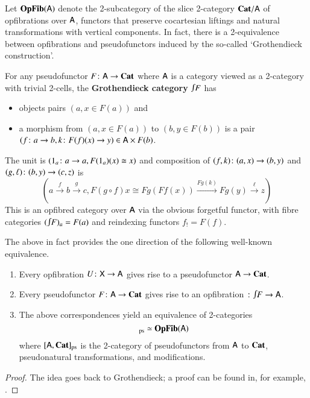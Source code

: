\documentclass[reqno]{amsart}
\begin{document}
Let $\mathbf{OpFib}(\mathsf{A})$ denote the 2-subcategory of the slice 2-category $\mathbf{Cat}/ \mathsf{A}$ of opfibrations over $\mathsf{A}$, functors that preserve cocartesian liftings and natural transformations with vertical components. In fact, there is a 2-equivalence between opfibrations and pseudofunctors induced by the so-called `Grothendieck construction'. 
\begin{defn}\label{def:GrothCat}
For any pseudofunctor $F\colon\mathsf{A}\to\mathbf{Cat}$ where $\mathsf{A}$ is a category viewed as a 2-category with trivial 2-cells, the \textbf{Grothendieck category}
$\inta F$ has
\begin{itemize}
\item objects pairs $(a, x \in F(a))$ and
\item a morphism from $(a, x \in F(a))$ to $(b, y\in F(b))$ is a pair $(f \colon a \to b,k \colon F(f)(x) \to y)\in\mathsf{A}\times F(b)$.
\end{itemize}
The unit is $(1_a\colon a\to a,F(1_a)(x)\cong x)$ and composition of $(f,k)\colon(a,x)\to(b,y)$ and $(g,\ell)\colon(b,y)\to(c,z)$ is
\begin{equation}\label{eq:compGrothcat}
\left(a\xrightarrow{f}b\xrightarrow{g}c, F(g\circ f)x\cong Fg(Ff(x))\xrightarrow{Fg(k)}Fg(y)\xrightarrow{\ell}z\right) 
\end{equation}
This is an opfibred category over $\mathsf{A}$ via the obvious forgetful functor, with fibre categories $(\inta F)_a=F(a)$ and reindexing functors $f_!=F(f)$.
\end{defn}
The above in fact provides the one direction of the following well-known equivalence.

\begin{thm}\label{thm:Grothendieck}\hfill
\begin{enumerate}
\item Every opfibration $U \colon \mathsf{X} \to \mathsf{A}$ gives rise to a pseudofunctor $\mathsf{A} \to \mathbf{Cat}$.
\item Every pseudofunctor $F \colon \mathsf{A} \to \mathbf{Cat}$ gives rise to  an opfibration $\maps \inta F\to\A$.
\item The above correspondences yield an equivalence of 2-categories 
\begin{displaymath}
[\A,\Cat]_\pse \simeq \OpFib(\A)
\end{displaymath}
where $[\mathsf{A},\mathbf{Cat}]_{\mathrm{ps}}$ is the 2-category of pseudofunctors from $\mathsf{A}$ to $\mathbf{Cat}$, pseudonatural transformations, and modifications.
\end{enumerate}
\end{thm}

\begin{proof}  
The idea goes back to Grothendieck; a proof can be found in, for example, \cite[Section 1.10]{Jacobs}.
\end{proof}
\end{document}
